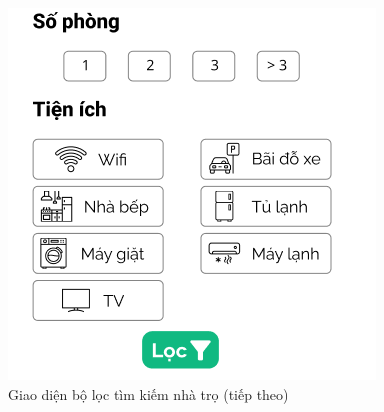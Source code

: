 \begin{figure}[!htb]
\begin{minipage}{0.32\textwidth}
     \includegraphics[width=1\linewidth]{Images/UI figma/Frame 2.png}
     \caption{Giao diện bộ lọc tìm kiếm nhà trọ (tiếp theo)}
   \end{minipage}
\end{figure}
\newpage
